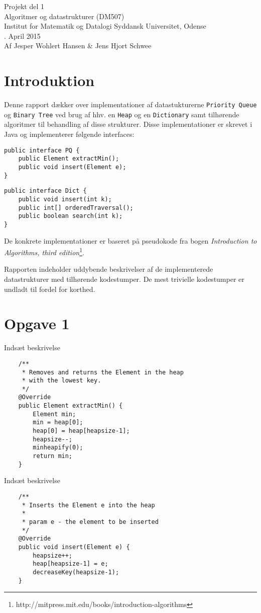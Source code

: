 \documentclass{article}
\begin{document}
{\centering 
\huge
Projekt del 1\\
Algoritmer og datastrukturer (DM507)\\
\large
\bigskip
Institut for Matematik og Datalogi Syddansk Universitet, Odense\\
. April 2015\\
\bigskip
Af Jesper Wohlert Hansen \& Jens Hjort Schwee\\
}
\newpage

\section*{Introduktion}
Denne rapport dækker over implementationer af datastukturerne \texttt{Priority Queue} og \texttt{Binary Tree} ved brug af hhv. en \texttt{Heap} og en \texttt{Dictionary} samt tilhørende algoritmer til behandling af disse strukturer. Disse implementationer er skrevet i Java og implementerer følgende interfaces:

\begin{verbatim}
public interface PQ {
    public Element extractMin();
    public void insert(Element e);
}
\end{verbatim}


\begin{verbatim}
public interface Dict {
    public void insert(int k);
    public int[] orderedTraversal();
    public boolean search(int k);
}
\end{verbatim}

De konkrete implementationer er baseret på pseudokode fra bogen \emph{Introduction to Algorithms, third edition}\footnote{http://mitpress.mit.edu/books/introduction-algorithms}.


Rapporten indeholder uddybende beskrivelser af de implementerede datastrukturer med tilhørende kodestumper. De mest trivielle kodestumper er undladt til fordel for korthed.

\newpage

\section*{Opgave 1}

Indsæt beskrivelse
\begin{lstlisting}
	/**
     * Removes and returns the Element in the heap
     * with the lowest key.
     */
    @Override
    public Element extractMin() {
        Element min;
        min = heap[0];
        heap[0] = heap[heapsize-1];
        heapsize--;
        minheapify(0);
        return min;
    }    
\end{lstlisting}
Indsæt beskrivelse
\begin{lstlisting}
	/**
     * Inserts the Element e into the heap
     *
     * param e - the element to be inserted
     */
    @Override
    public void insert(Element e) {
        heapsize++;
        heap[heapsize-1] = e;
        decreaseKey(heapsize-1);
    }
\end{lstlisting}
\newpage
\end{document}
